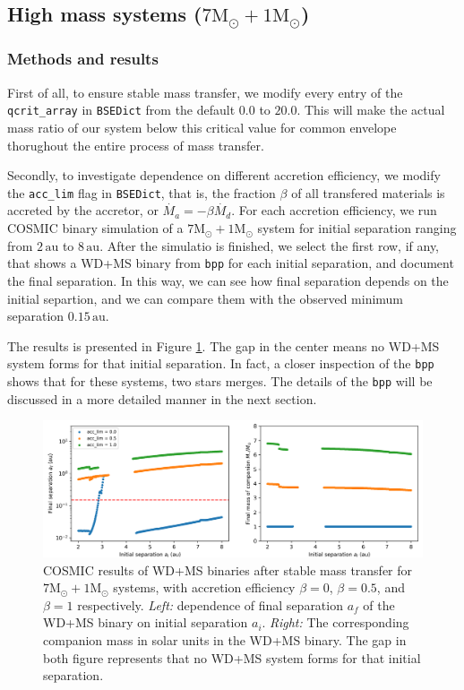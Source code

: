\documentclass[12pt]{article}
\newcommand{\Msun}{\mathrm{M_{\odot}}}
\newcommand{\au}{\, \mathrm{au}}
\begin{document}
\subsection{High mass systems ($7\Msun + 1\Msun$)}

\subsubsection{Methods and results}
First of all, to ensure stable mass transfer, we modify every entry of the \verb|qcrit_array| in \verb|BSEDict| from the default $0.0$ to $20.0$. This will make the actual mass ratio of our system below this critical value for common envelope thorughout the entire process of mass transfer.

Secondly, to investigate dependence on different accretion efficiency, we modify the \verb|acc_lim| flag in \verb|BSEDict|, that is, the fraction $\beta$ of all transfered materials is accreted by the accretor, or $\dot{M_a} = - \beta\dot{M_d}$. For each accretion efficiency, we run COSMIC binary simulation of a $7\Msun + 1 \Msun$ system for initial separation ranging from $2 \au$ to $8 \au$. After the simulatio is finished, we select the first row, if any, that shows a WD+MS binary from \verb|bpp| for each initial separation, and document the final separation. In this way, we can see how final separation depends on the initial separtion, and we can compare them with the observed minimum separation $0.15\au$. 

The results is presented in Figure \ref{stable_hi}. The gap in the center means no WD+MS system forms for that initial separation. In fact, a closer inspection of the \verb|bpp| shows that for these systems, two stars merges. The details of the \verb|bpp| will be discussed in a more detailed manner in the next section.

\begin{figure}
    \centering
    \includegraphics[width=0.75\linewidth]{fig/stable_hi_log.png}
    \caption{COSMIC results of WD+MS binaries after stable mass transfer for $7\Msun + 1\Msun$ systems, with accretion efficiency $\beta = 0$, $\beta = 0.5$, and $\beta = 1$ respectively. \emph{Left:} dependence of final separation $a_f$ of the WD+MS binary on initial separation $a_i$. \emph{Right:} The corresponding companion mass in solar units in the WD+MS binary. The gap in both figure represents that no WD+MS system forms for that initial separation.}
    \label{stable_hi}
\end{figure}
\end{document}
